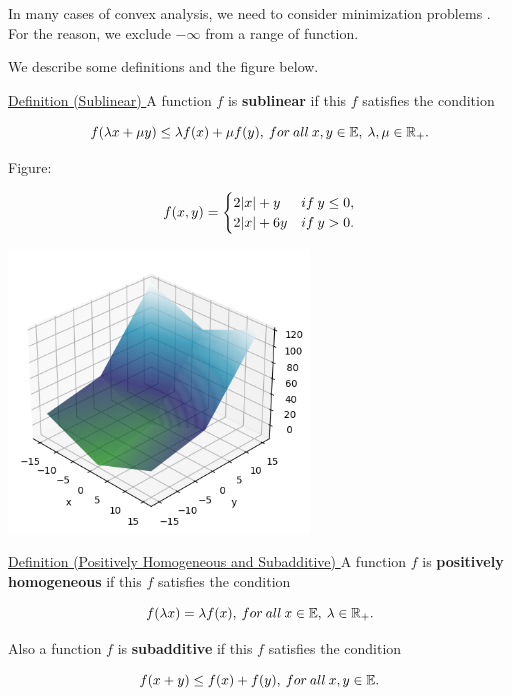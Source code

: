 \documentclass[a4paper,11pt]{jsarticle}
\begin{document}
In many cases of convex analysis, we need to
consider minimization problems . For the reason, we exclude $-\infty$ from a range of function.

We describe some definitions and the figure below.

\begin{itembox}[l]{\underline{Definition (Sublinear) }}
  A function $f$ is \textbf{sublinear} if this $f$ satisfies the condition

  \begin{equation}
    f(\lambda x + \mu y) \leq \lambda f(x) + \mu f(y),\:for \:all\: x, y \in{\mathbb{E}},\: \lambda, \mu \in{\mathbb{R}}_+. \notag
  \end{equation}
\end{itembox}

Figure:

\begin{equation}
  f(x, y)=
  \begin{cases}
    2|x| + y & if\:y \leq 0, \\
    2|x| + 6y & if\:y > 0. \notag
  \end{cases}
\end{equation}

\begin{center}
  \includegraphics[width=8cm]{sublinear_output.png}
\end{center}

\begin{itembox}[l]{\underline{Definition (Positively Homogeneous and Subadditive) }}
  A function $f$ is \textbf{positively homogeneous} if this $f$ satisfies the condition

  \begin{equation}
    f(\lambda x) = \lambda f(x),\:for \:all\: x \in{\mathbb{E}},\: \lambda \in{\mathbb{R}}_+. \notag
  \end{equation}

  Also a function $f$ is \textbf{subadditive} if this $f$ satisfies the condition

  \begin{equation}
    f( x + y) \leq f(x) + f(y),\:for \:all\: x, y \in{\mathbb{E}}. \notag
  \end{equation}
\end{itembox}
\end{document}
